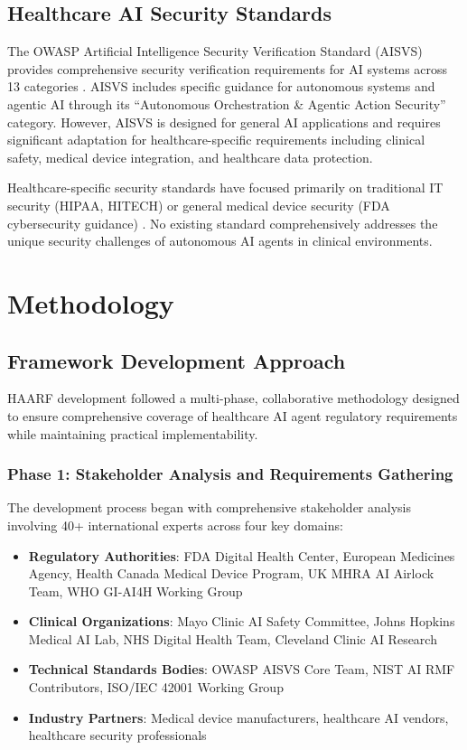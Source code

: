 \documentclass[11pt]{article}
\begin{document}
\subsection{Healthcare AI Security Standards}

The OWASP Artificial Intelligence Security Verification Standard (AISVS) provides comprehensive security verification requirements for AI systems across 13 categories \cite{owasp2024aisvs}. AISVS includes specific guidance for autonomous systems and agentic AI through its ``Autonomous Orchestration \& Agentic Action Security'' category. However, AISVS is designed for general AI applications and requires significant adaptation for healthcare-specific requirements including clinical safety, medical device integration, and healthcare data protection.

Healthcare-specific security standards have focused primarily on traditional IT security (HIPAA, HITECH) or general medical device security (FDA cybersecurity guidance) \cite{fda2018cybersecurity}. No existing standard comprehensively addresses the unique security challenges of autonomous AI agents in clinical environments.

\section{Methodology}

\subsection{Framework Development Approach}

HAARF development followed a multi-phase, collaborative methodology designed to ensure comprehensive coverage of healthcare AI agent regulatory requirements while maintaining practical implementability.

\subsubsection{Phase 1: Stakeholder Analysis and Requirements Gathering}

The development process began with comprehensive stakeholder analysis involving 40+ international experts across four key domains:

\begin{itemize}
    \item \textbf{Regulatory Authorities}: FDA Digital Health Center, European Medicines Agency, Health Canada Medical Device Program, UK MHRA AI Airlock Team, WHO GI-AI4H Working Group
    \item \textbf{Clinical Organizations}: Mayo Clinic AI Safety Committee, Johns Hopkins Medical AI Lab, NHS Digital Health Team, Cleveland Clinic AI Research
    \item \textbf{Technical Standards Bodies}: OWASP AISVS Core Team, NIST AI RMF Contributors, ISO/IEC 42001 Working Group
    \item \textbf{Industry Partners}: Medical device manufacturers, healthcare AI vendors, healthcare security professionals
\end{itemize}
\end{document}
